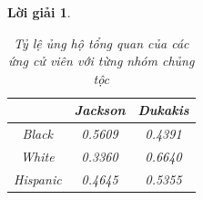 \documentclass[14pt, a4paper]{article}
\theoremstyle{sltheorem}
\theoremstyle{soltheorem}
\newtheorem*{loigiai}{Lời giải}
\begin{document}
\begin{loigiai}
\begin{enumerate}
    \begin{table}[H]
        \centering
        \begin{tabular}{|c|c|c|}
        \hline
        & Jackson & Dukakis \\
        \hline
        Black & 0.5609 & 0.4391 \\
        \hline
        White & 0.3360 & 0.6640 \\
        \hline
        Hispanic & 0.4645 & 0.5355 \\
        \hline
        \end{tabular}
        \caption{Tỷ lệ ủng hộ tổng quan của các ứng cử viên với từng nhóm chủng tộc}
    \end{table}
    \end{enumerate}
\end{loigiai}


\newpage
\printbibliography[title={TÀI LIỆU THAM KHẢO}]
\end{document}
